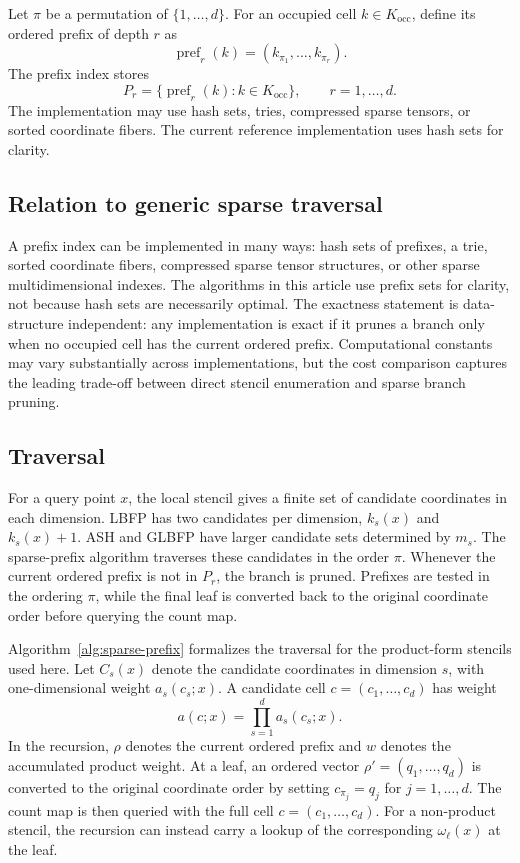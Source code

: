 \documentclass[pdflatex,sn-mathphys-ay]{sn-jnl}
\theoremstyle{thmstyleone}
\begin{document}
Let \(\pi\) be a permutation of \(\{1,\ldots,d\}\). For an occupied cell \(k\in K_{\mathrm{occ}}\), define its ordered prefix of depth \(r\) as
\[
\operatorname{pref}_r(k)
=
(k_{\pi_1},\ldots,k_{\pi_r}).
\]
The prefix index stores
\[
P_r
=
\{\operatorname{pref}_r(k):k\in K_{\mathrm{occ}}\},
\qquad r=1,\ldots,d.
\]
The implementation may use hash sets, tries, compressed sparse tensors, or sorted coordinate fibers. The current reference implementation uses hash sets for clarity.

\subsection{Relation to generic sparse traversal}

A prefix index can be implemented in many ways: hash sets of prefixes, a trie, sorted coordinate fibers, compressed sparse tensor structures, or other sparse multidimensional indexes. The algorithms in this article use prefix sets for clarity, not because hash sets are necessarily optimal. The exactness statement is data-structure independent: any implementation is exact if it prunes a branch only when no occupied cell has the current ordered prefix. Computational constants may vary substantially across implementations, but the cost comparison captures the leading trade-off between direct stencil enumeration and sparse branch pruning.

\subsection{Traversal}

For a query point \(x\), the local stencil gives a finite set of candidate coordinates in each dimension. LBFP has two candidates per dimension, \(k_s(x)\) and \(k_s(x)+1\). ASH and GLBFP have larger candidate sets determined by \(m_s\). The sparse-prefix algorithm traverses these candidates in the order \(\pi\). Whenever the current ordered prefix is not in \(P_r\), the branch is pruned. Prefixes are tested in the ordering \(\pi\), while the final leaf is converted back to the original coordinate order before querying the count map.

Algorithm~\ref{alg:sparse-prefix} formalizes the traversal for the product-form stencils used here. Let \(C_s(x)\) denote the candidate coordinates in dimension \(s\), with one-dimensional weight \(a_s(c_s;x)\). A candidate cell \(c=(c_1,\ldots,c_d)\) has weight
\[
a(c;x)=\prod_{s=1}^d a_s(c_s;x).
\]
In the recursion, \(\rho\) denotes the current ordered prefix and \(w\) denotes the accumulated product weight. At a leaf, an ordered vector \(\rho'=(q_1,\ldots,q_d)\) is converted to the original coordinate order by setting \(c_{\pi_j}=q_j\) for \(j=1,\ldots,d\). The count map is then queried with the full cell \(c=(c_1,\ldots,c_d)\). For a non-product stencil, the recursion can instead carry a lookup of the corresponding \(\omega_\ell(x)\) at the leaf.
\end{document}
